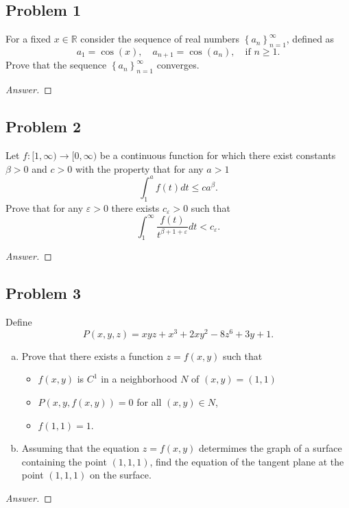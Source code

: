 \documentclass[12pt]{article}
\newcommand{\real}{\mathbb{R}}
\newcommand\paren[1]{\left( #1 \right)}
\newcommand\setb[1]{\left \{ #1 \right \}}
\newcommand{\eps}{\varepsilon}
\theoremstyle{definition}
\begin{document}
\subsection{Problem 1}
For a fixed $x \in \real$ consider the sequence of real numbers $\setb{ a_n }_{n = 1}^{\infty}$, defined as 
\[
    a_1 = \cos(x) , \quad a_{n+1} = \cos \paren{ a_n } , \quad \text{if $n \geq 1$.}
\]
Prove that the sequence $\setb{ a_n }_{n = 1}^{\infty}$ converges. 

\begin{proof}[Answer]
    
\end{proof}

\subsection{Problem 2}
Let $f : [1,\infty) \to [0,\infty)$ be a continuous function for which there exist constants $\beta > 0$ and $c > 0$ with the property that for any $a > 1$
\[
    \int_1^a f(t) dt \leq c a^{\beta} . 
\]
Prove that for any $\eps > 0$ there exists $c_{\eps} > 0$ such that 
\[
    \int_1^{\infty} \frac{f(t)}{t^{\beta + 1 + \eps}} dt < c_{\eps} . 
\]
\begin{proof}[Answer]
    
\end{proof}

\subsection{Problem 3}
Define 
\[
    P(x,y,z) = xyz + x^3 + 2xy^2 - 8z^6 + 3y + 1 . 
\]
\begin{enumerate}[(a)]
    \item Prove that there exists a function $z = f(x,y)$ such that 
    \begin{itemize}
        \item $f(x,y)$ is $C^1$ in a neighborhood $N$ of $(x,y) = (1,1)$
        \item $P(x,y,f(x,y)) = 0$ for all $(x,y) \in N$,
        \item $f(1,1) = 1$.
    \end{itemize}
    \item Assuming that the equation $z = f(x,y)$ determimes the graph of a surface containing the point $(1,1,1)$, find the equation of the tangent plane at the point $(1,1,1)$ on the surface. 
\end{enumerate}
\begin{proof}[Answer]
    
\end{proof}
\end{document}
